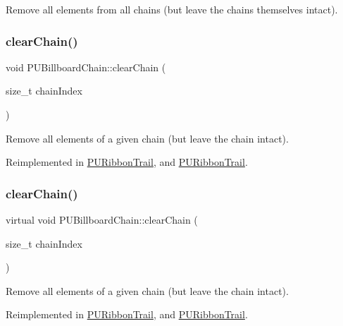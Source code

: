 Remove all elements from all chains (but leave the chains themselves intact). \mbox{\label{classPUBillboardChain_a95dbb4b66dabb496bc3c9448e9e0a06f}} 
\subsubsection{\texorpdfstring{clear\+Chain()}{clearChain()}\hspace{0.1cm}{\footnotesize\ttfamily [1/2]}}
{\footnotesize\ttfamily void P\+U\+Billboard\+Chain\+::clear\+Chain (\begin{DoxyParamCaption}\item[{size\+\_\+t}]{chain\+Index }\end{DoxyParamCaption})\hspace{0.3cm}{\ttfamily [virtual]}}

Remove all elements of a given chain (but leave the chain intact). 

Reimplemented in \hyperlink{classPURibbonTrail_adb54132f235ef4e7378059f72c76afd2}{P\+U\+Ribbon\+Trail}, and \hyperlink{classPURibbonTrail_adb54132f235ef4e7378059f72c76afd2}{P\+U\+Ribbon\+Trail}.

\mbox{\label{classPUBillboardChain_a5bb3931ebcca77e14e9f0be4d1bc8dac}} 
\subsubsection{\texorpdfstring{clear\+Chain()}{clearChain()}\hspace{0.1cm}{\footnotesize\ttfamily [2/2]}}
{\footnotesize\ttfamily virtual void P\+U\+Billboard\+Chain\+::clear\+Chain (\begin{DoxyParamCaption}\item[{size\+\_\+t}]{chain\+Index }\end{DoxyParamCaption})\hspace{0.3cm}{\ttfamily [virtual]}}

Remove all elements of a given chain (but leave the chain intact). 

Reimplemented in \hyperlink{classPURibbonTrail_adb54132f235ef4e7378059f72c76afd2}{P\+U\+Ribbon\+Trail}, and \hyperlink{classPURibbonTrail_adb54132f235ef4e7378059f72c76afd2}{P\+U\+Ribbon\+Trail}.

